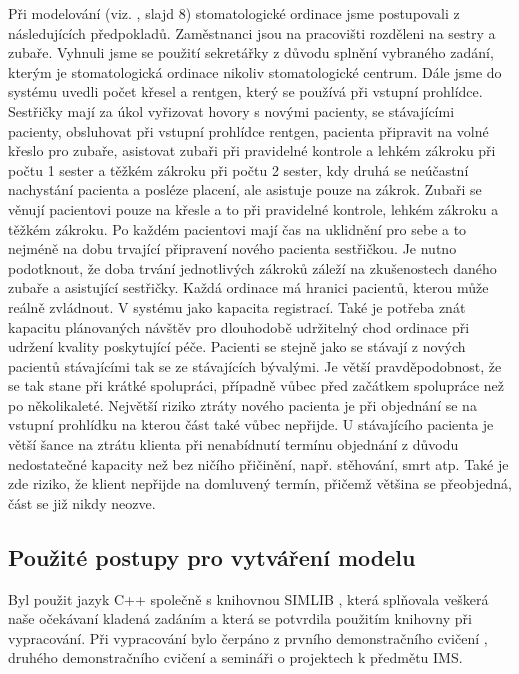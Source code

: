 \documentclass[a4paper,11pt,titlepage]{article}
\begin{document}
Při modelování (viz. \cite{ims}, slajd 8) stomatologické ordinace jsme postupovali z následujících předpokladů. Zaměstnanci jsou na pracovišti rozděleni na sestry a zubaře. Vyhnuli jsme se použití sekretářky z důvodu splnění vybraného zadání, kterým je stomatologická ordinace nikoliv stomatologické centrum. Dále jsme do systému uvedli počet křesel a rentgen, který se používá při vstupní prohlídce.
\newline
Sestřičky mají za úkol vyřizovat hovory s novými pacienty, se stávajícími pacienty, obsluhovat při vstupní prohlídce rentgen, pacienta připravit na volné křeslo pro zubaře, asistovat zubaři při pravidelné kontrole a lehkém zákroku při počtu 1 sester a těžkém zákroku při počtu 2 sester, kdy druhá se neúčastní nachystání pacienta a posléze placení, ale asistuje pouze na zákrok.
\newline
Zubaři se věnují pacientovi pouze na křesle a to při pravidelné kontrole, lehkém zákroku a těžkém zákroku. Po každém pacientovi mají čas na uklidnění pro sebe a to nejméně na dobu trvající připravení nového pacienta sestřičkou. Je nutno podotknout, že doba trvání jednotlivých zákroků záleží na zkušenostech daného zubaře a asistující sestřičky.
\newline
Každá ordinace má hranici pacientů, kterou může reálně zvládnout. V systému jako kapacita registrací. Také je potřeba znát kapacitu plánovaných návštěv pro dlouhodobě udržitelný chod ordinace při udržení kvality poskytující péče.
\newline
Pacienti se stejně jako se stávají z nových pacientů stávajícími tak se ze stávajících bývalými. Je větší pravděpodobnost, že se tak stane při krátké spolupráci, případně vůbec před začátkem spolupráce než po několikaleté. 
\newline
Největší riziko ztráty nového pacienta je při objednání se na vstupní prohlídku na kterou část také vůbec nepřijde. 
\newline
U stávajícího pacienta je větší šance na ztrátu klienta při nenabídnutí termínu objednání z důvodu nedostatečné kapacity než bez ničího přičinění, např. stěhování, smrt atp. Také je zde riziko, že klient nepřijde na domluvený termín, přičemž většina se přeobjedná, část se již nikdy neozve.

\subsection{Použité postupy pro vytváření modelu}

Byl použit jazyk C++ společně s knihovnou SIMLIB \cite{simlib}, která splňovala veškerá naše očekávaní kladená zadáním a která se potvrdila použitím knihovny při vypracování. Při vypracování bylo čerpáno z prvního demonstračního cvičení \cite{dem01}, druhého demonstračního cvičení\cite{dem02} a semináři o projektech \cite{seminar} k předmětu IMS.
\end{document}
